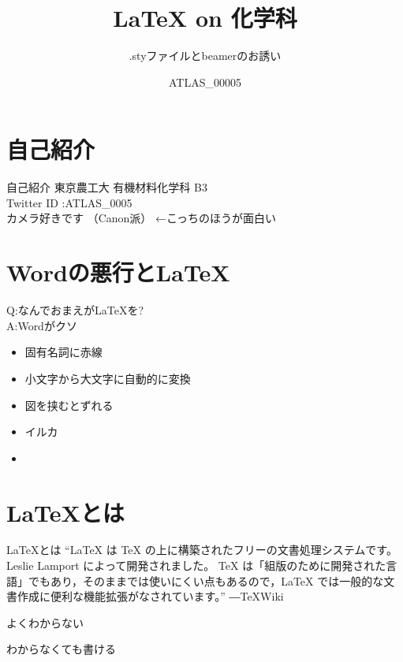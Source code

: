 \documentclass[dvipdfmx]{beamer}
\title[TUAT TECH TALK]{\LaTeX{} on 化学科}
\subtitle{.styファイルとbeamerのお誘い}
\author{ATLAS\_00005}
\institute{東京農工大}
\begin{document}
\frame{\titlepage}
\begin{frame}
	\tableofcontents
\end{frame}

\section{自己紹介}
	\begin{frame}{自己紹介}
		東京農工大 \alert{有機材料化学科} B3 \\
		Twitter ID :ATLAS\_0005 \\
		カメラ好きです （Canon派） {\color{gray}←こっちのほうが面白い}\\
	\end{frame}
\section{Wordの悪行とLaTeX}
\begin{frame}
		Q:なんでおまえがLaTeXを?\\ \pause
		A:\alert{\huge{Wordがクソ}}
\end{frame}
\begin{frame}
	\begin{itemize}
		\frametitle{Wordの嫌いなところ}
		\item 固有名詞に赤線
		\item 小文字から大文字に自動的に変換
		\item 図を挟むとずれる
		\item \alert{イルカ} 
		\item {}
	\end{itemize}
\end{frame}
\section{\LaTeX{}とは}
	\begin{frame}{\LaTeX{}とは}
	``LaTeX は TeX の上に構築されたフリーの文書処理システムです。 Leslie Lamport によって開発されました。 TeX は「組版のために開発された言語」でもあり，そのままでは使いにくい点もあるので，LaTeX では一般的な文書作成に便利な機能拡張がなされています。'' ―TeXWiki
	\end{frame}

	\begin{frame}
		\huge{よくわからない}
	\end{frame}

	\begin{frame}
		\huge{わからなくても書ける}
	\end{frame}
\end{document}
